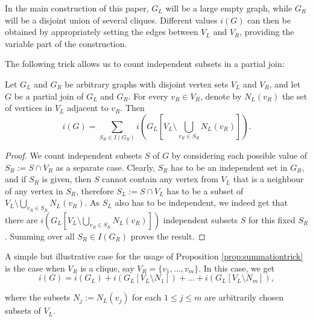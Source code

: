 \documentclass[10pt,a4paper]{article}
\numberwithin{equation}{section}
\begin{document}
In the main construction of this paper, $G_L$ will be a large empty graph, while $G_R$ will be a disjoint union of several cliques. Different values $i(G)$ can then be obtained by appropriately setting the edges between $V_L$ and $V_R$, providing the variable part of the construction.

The following trick allows us to count independent subsets in a partial join:

\begin{proposition}\label{prop:summationtrick}
Let $G_L$ and $G_R$ be arbitrary graphs with disjoint vertex sets $V_L$ and $V_R$, and let $G$ be a partial join of $G_L$ and $G_R$. For every $v_R\in V_R$, denote by $N_L(v_R)$ the set of vertices in $V_L$ adjacent to $v_R$. Then
$$i(G)=\sum_{S_R\in I(G_R)} i\left(G_L\left[V_L\setminus \bigcup_{v_R\in S_R} N_L(v_R)\right]\right).$$
\end{proposition}
\begin{proof}
We count independent subsets $S$ of $G$ by considering each possible value of $S_R:=S\cap V_R$ as a separate case. Clearly, $S_R$ has to be an independent set in $G_R$, and if $S_R$ is given, then $S$ cannot contain any vertex from $V_L$ that is a neighbour of any vertex in $S_R$, therefore $S_L:=S\cap V_L$ has to be a subset of $V_L\setminus \bigcup\limits_{v_R\in S_R} N_L(v_R)$. As $S_L$ also has to be independent, we indeed get that there are $i(G_L[V_L\setminus\bigcup\limits_{v_R\in S_R} N_L(v_R)])$ independent subsets $S$ for this fixed $S_R$. Summing over all $S_R\in I(G_R)$ proves the result.
\end{proof}

\begin{example}\label{ex:oneclique}
A simple but illustrative case for the usage of Proposition \ref{prop:summationtrick} is the case when $V_R$ is a clique, say $V_R=\{v_1, \ldots, v_m\}$. In this case, we get
$$i(G)=i(G_L)+i(G_L[V_L\setminus N_1])+\ldots+i(G_L[V_L\setminus N_m]),$$

\noindent where the subsets $N_j:=N_L(v_j)$ for each $1\le j\le m$ are arbitrarily chosen subsets of $V_L$.
\end{example}
\end{document}
